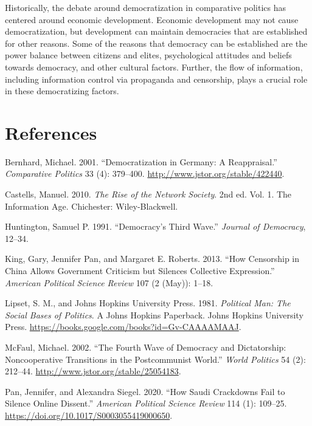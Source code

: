 \documentclass[12pt,]{article}
\begin{document}
Historically, the debate around democratization in comparative politics
has centered around economic development. Economic development may not
cause democratization, but development can maintain democracies that are
established for other reasons. Some of the reasons that democracy can be
established are the power balance between citizens and elites,
psychological attitudes and beliefs towards democracy, and other
cultural factors. Further, the flow of information, including
information control via propaganda and censorship, plays a crucial role
in these democratizing factors.

\hypertarget{references}{%
\section*{References}\label{references}}

\hypertarget{refs}{}
\leavevmode\hypertarget{ref-bernhard}{}%
Bernhard, Michael. 2001. ``Democratization in Germany: A Reappraisal.''
\emph{Comparative Politics} 33 (4): 379--400.
\url{http://www.jstor.org/stable/422440}.

\leavevmode\hypertarget{ref-castells}{}%
Castells, Manuel. 2010. \emph{The Rise of the Network Society}. 2nd ed.
Vol. 1. The Information Age. Chichester: Wiley-Blackwell.

\leavevmode\hypertarget{ref-huntington}{}%
Huntington, Samuel P. 1991. ``Democracy's Third Wave.'' \emph{Journal of
Democracy}, 12--34.

\leavevmode\hypertarget{ref-king}{}%
King, Gary, Jennifer Pan, and Margaret E. Roberts. 2013. ``How
Censorship in China Allows Government Criticism but Silences Collective
Expression.'' \emph{American Political Science Review} 107 (2 (May)):
1--18.

\leavevmode\hypertarget{ref-lipset}{}%
Lipset, S. M., and Johns Hopkins University Press. 1981. \emph{Political
Man: The Social Bases of Politics}. A Johns Hopkins Paperback. Johns
Hopkins University Press.
\url{https://books.google.com/books?id=Gv-CAAAAMAAJ}.

\leavevmode\hypertarget{ref-mcfaul}{}%
McFaul, Michael. 2002. ``The Fourth Wave of Democracy and Dictatorship:
Noncooperative Transitions in the Postcommunist World.'' \emph{World
Politics} 54 (2): 212--44. \url{http://www.jstor.org/stable/25054183}.

\leavevmode\hypertarget{ref-pan2020}{}%
Pan, Jennifer, and Alexandra Siegel. 2020. ``How Saudi Crackdowns Fail
to Silence Online Dissent.'' \emph{American Political Science Review}
114 (1): 109--25. \url{https://doi.org/10.1017/S0003055419000650}.
\end{document}
